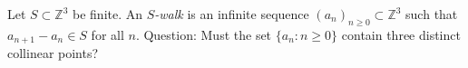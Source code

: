 Let $S\subset\mathbb{Z}^3$ be finite.
An \emph{$S$-walk} is an infinite sequence $(a_n)_{n\ge 0}\subset\mathbb{Z}^3$ such that $a_{n+1}-a_n\in S$ for all $n$.
Question: Must the set $\{a_n:n\ge 0\}$ contain three distinct collinear points?
